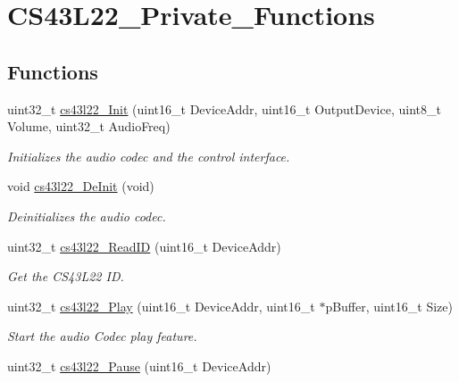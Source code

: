 \hypertarget{group___c_s43_l22___private___functions}{}\section{C\+S43\+L22\+\_\+\+Private\+\_\+\+Functions}
\label{group___c_s43_l22___private___functions}
\subsection*{Functions}
\begin{DoxyCompactItemize}
\item 
uint32\+\_\+t \mbox{\hyperlink{group___c_s43_l22___private___functions_ga47b373a281c7ba0ea0fac752f3d0a903}{cs43l22\+\_\+\+Init}} (uint16\+\_\+t Device\+Addr, uint16\+\_\+t Output\+Device, uint8\+\_\+t Volume, uint32\+\_\+t Audio\+Freq)
\begin{DoxyCompactList}\small\item\em Initializes the audio codec and the control interface. \end{DoxyCompactList}\item 
void \mbox{\hyperlink{group___c_s43_l22___private___functions_gaeba1251bafcbeacb591dfe8cb8175447}{cs43l22\+\_\+\+De\+Init}} (void)
\begin{DoxyCompactList}\small\item\em Deinitializes the audio codec. \end{DoxyCompactList}\item 
uint32\+\_\+t \mbox{\hyperlink{group___c_s43_l22___private___functions_gad4e4e8b889500f0e64c546a31d4b6dca}{cs43l22\+\_\+\+Read\+ID}} (uint16\+\_\+t Device\+Addr)
\begin{DoxyCompactList}\small\item\em Get the C\+S43\+L22 ID. \end{DoxyCompactList}\item 
uint32\+\_\+t \mbox{\hyperlink{group___c_s43_l22___private___functions_ga1a210c3782b3d56db00565d4699f4c89}{cs43l22\+\_\+\+Play}} (uint16\+\_\+t Device\+Addr, uint16\+\_\+t $\ast$p\+Buffer, uint16\+\_\+t Size)
\begin{DoxyCompactList}\small\item\em Start the audio Codec play feature. \end{DoxyCompactList}\item 
uint32\+\_\+t \mbox{\hyperlink{group___c_s43_l22___private___functions_gafc49ea6a76539430cd303849b60ae38d}{cs43l22\+\_\+\+Pause}} (uint16\+\_\+t Device\+Addr)

\end{DoxyCompactItemize}
